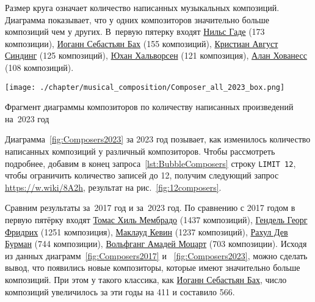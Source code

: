 Размер круга означает количество написанных музыкальных композиций. Диаграмма показывает, что у одних композиторов значительно больше композиций чем у других. В~первую пятерку входят \href{https://ru.wikipedia.org/wiki/Гаде,_Нильс}{Нильс Гаде} (\num{173} композиции), \href{https://ru.wikipedia.org/wiki/Бах,_Иоганн_Себастьян}{Иоганн Себастьян Бах} (\num{155} композиций), \href{https://ru.wikipedia.org/wiki/Синдинг,_Кристиан_Август}{Кристиан Август Синдинг} (\num{125} композиций), \href{https://ru.wikipedia.org/wiki/Хальворсен,_Юхан}{Юхан Хальворсен} (\num{121} композиция), \href{https://ru.wikipedia.org/wiki/Хованесс,_Алан}{Алан Хованесс} (\num{108} композиций).

%
%
\begin{marginfigure}
  \texttt{[image: ./chapter/musical\_composition/Composer\_all\_2023\_box.png]}
  \vspace{-7pt}
  \caption[Пузырьковая диаграмма композиторов по количеству написанных композиций на~2023 год]
    {Фрагмент диаграммы композиторов по количеству написанных произведений на~2023 год}%
  \label{fig:Composers2023}%
\end{marginfigure}

Диаграмма~\ref{fig:Composers2023} за 2023 год позывает, 
как изменилось количество написанных композиций у различный композиторов. 
Чтобы рассмотреть подробнее, 
добавим в конец запроса~\ref{lst:BubbleComposers} строку  \lstinline|LIMIT 12|, 
чтобы ограничить количество записей до 12, 
получим следующий запрос \href{https://w.wiki/8A2h}{https://w.wiki/8A2h}, 
результат на рис.~\ref{fig:12composers}. 


Сравним результаты за~2017 год и за~2023 год.
По сравнению с 2017 годом в первую пятёрку входят 
\href{https://ca.wikipedia.org/wiki/Tomàs_Gil_i_Membrado}{Томас Хиль Мембрадо} 
(\num{1437} композиций), 
\href{https://ru.wikipedia.org/wiki/Гендель,_Георг_Фридрих}{Гендель Георг Фридрих} (\num{1251} композиция), 
\href{https://ru.wikipedia.org/wiki/Маклауд,_Кевин}{Маклауд Кевин} (\num{1237} композиций), 
\href{https://en.wikipedia.org/wiki/R._D._Burman}{Рахул Дев Бурман} (\num{744} композиции), 
\href{https://ru.wikipedia.org/wiki/Моцарт,_Вольфганг_Амадей}{Вольфганг Амадей Моцарт} (\num{703} композиции). 
Исходя из данных диаграмм~\ref{fig:Composers2017} и ~\ref{fig:Composers2023}, 
можно сделать вывод, что появились новые композиторы, 
которые имеют значительно больше композиций. 
При этом у такого классика, как 
\href{https://ru.wikipedia.org/?curid=17950}{Иоганн Себастьян Бах}, 
число композиций увеличилось за эти годы на 411 и составило 566. 

